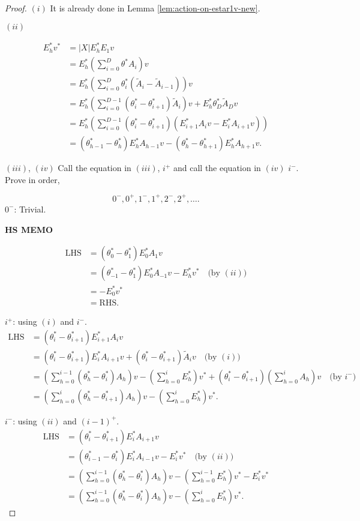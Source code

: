 \documentclass[
]{book}
\theoremstyle{definition}
\theoremstyle{definition}
\theoremstyle{definition}
\theoremstyle{definition}
\theoremstyle{remark}
\begin{document}
\begin{proof}
\leavevmode

\((i)\) It is already done in Lemma \ref{lem:action-on-estar1v-new}.

\((ii)\)

\begin{align}
E^*_hv^* & = |X|E^*_hE_1v\\
& = E^*_h\left(\sum_{i=0}^D\theta^*A_i\right)v\\
& = E^*_h\left(\sum_{i=0}^D\theta^*_i(\tilde{A}_i-\tilde{A}_{i-1})\right)v\\
& = E^*_h\left(\sum_{i=0}^{D-1}(\theta^*_i-\theta^*_{i+1})\tilde{A}_i\right)v + E^*_h\theta^*_D\tilde{A}_D v\\
& = E^*_h\left(\sum_{i=0}^{D-1}(\theta^*_i-\theta^*_{i+1})(E^*_{i+1}A_iv - E^*_iA_{i+1}v)\right)\\
& = (\theta^*_{h-1}-\theta^*_h)E^*_hA_{h-1}v - (\theta^*_h-\theta^*_{h+1})E^*_hA_{h+1}v.
\end{align}

\((iii)\), \((iv)\) Call the equation in \((iii)\), \(i^+\) and call the equation in \((iv)\) \(i^-\). Prove in order,

\[0^-, 0^+, 1^-, 1^+, 2^-, 2^+, \ldots .\]
\(0^-\): Trivial.

\textbf{HS MEMO}

\begin{align}
\mathrm{LHS} & = (\theta^*_0 - \theta^*_1)E^*_0A_1v \\
& = (\theta^*_{-1}-\theta^*_1)E^*_0A_{-1}v - E^*_hv^* \quad \text{(by $(ii)$)}\\
& = -E^*_0v^*\\
& = \mathrm{RHS}.
\end{align}

\(i^+\): using \((i)\) and \(i^-\).
\begin{align}
\mathrm{LHS} & = (\theta^*_i - \theta^*_{i+1})E^*_{i+1}A_iv \\
& = (\theta^*_{i}-\theta^*_{i+1})E^*_{i}A_{i+1}v + (\theta^*_i-\theta^*_{i+1})\tilde{A}_iv \quad \text{(by $(i)$)}\\
& = \left(\sum_{h=0}^{i-1}(\theta^*_h-\theta^*_{i})A_h\right)v - \left(\sum_{h=0}^i E^*_h\right)v^* + (\theta^*_i-\theta^*_{i+1})\left(\sum_{h=0}^i A_h\right)v \quad \text{(by $i^-$)}\\
& = \left(\sum_{h=0}^i (\theta^*_h-\theta^*_{i+1})A_h\right)v - \left(\sum_{h=0}^i E^*_h\right)v^*.
\end{align}

\(i^-\): using \((ii)\) and \((i-1)^+\).
\begin{align}
\mathrm{LHS} & = (\theta^*_i - \theta^*_{i+1})E^*_{i}A_{i+1}v \\
& = (\theta^*_{i-1}-\theta^*_{i})E^*_{i}A_{i-1}v - E^*_iv^* \quad \text{(by $(ii)$)}\\
& = \left(\sum_{h=0}^{i-1}(\theta^*_h-\theta^*_{i})A_h\right)v - \left(\sum_{h=0}^{i-1} E^*_h\right)v^* - E^*_iv^*\\ 
& = \left(\sum_{h=0}^{i-1} (\theta^*_h-\theta^*_{i})A_h\right)v - \left(\sum_{h=0}^i E^*_h\right)v^*.
\end{align}


\end{proof}
\end{document}
